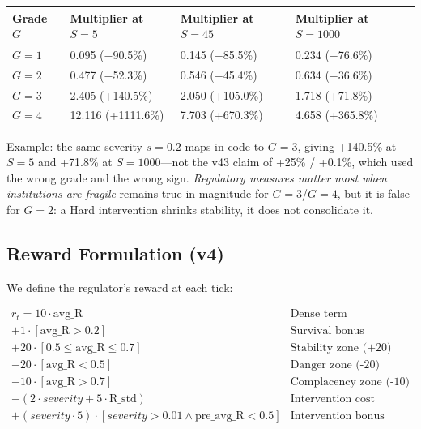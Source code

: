 \documentclass[11pt]{article}
\begin{document}
\begin{table}[htbp]
\centering
\begin{tabular}{llll}
\toprule
\textbf{Grade $G$} & \textbf{Multiplier at $S=5$} & \textbf{Multiplier at $S=45$} & \textbf{Multiplier at $S=1000$} \\
\midrule
$G=1$ & 0.095 ($-$90.5\%) & 0.145 ($-$85.5\%) & 0.234 ($-$76.6\%) \\
$G=2$ & 0.477 ($-$52.3\%) & 0.546 ($-$45.4\%) & 0.634 ($-$36.6\%) \\
$G=3$ & 2.405 (+140.5\%) & 2.050 (+105.0\%) & 1.718 (+71.8\%) \\
$G=4$ & 12.116 (+1111.6\%) & 7.703 (+670.3\%) & 4.658 (+365.8\%) \\
\bottomrule
\end{tabular}
\end{table}

Example: the same severity $s=0.2$ maps in code to $G=3$, giving +140.5\% at $S=5$ and +71.8\% at $S=1000$---not the v43 claim of +25\% / +0.1\%, which used the wrong grade and the wrong sign. \textit{Regulatory measures matter most when institutions are fragile} remains true in magnitude for $G=3$/$G=4$, but it is false for $G=2$: a Hard intervention shrinks stability, it does not consolidate it.

\subsection{Reward Formulation (v4)}
We define the regulator's reward at each tick:

\[
\begin{aligned}
r_t = 10\cdot\mathrm{avg\_R} &\text{Dense term} \\
+ 1\cdot\left[\mathrm{avg\_R} > 0.2\right] &\text{Survival bonus} \\
+ 20\cdot\left[0.5 \leq \mathrm{avg\_R} \leq 0.7\right] &\text{Stability zone (+20)} \\
- 20\cdot\left[\mathrm{avg\_R} < 0.5\right] &\text{Danger zone (-20)} \\
- 10\cdot\left[\mathrm{avg\_R} > 0.7\right] &\text{Complacency zone (-10)} \\
- (2\cdot severity + 5\cdot\mathrm{R\_std}) &\text{Intervention cost} \\
+ (severity\cdot5)\cdot\left[severity>0.01 \wedge \mathrm{pre\_avg\_R}<0.5\right] &\text{Intervention bonus} \\
\end{aligned}
\]
\end{document}
